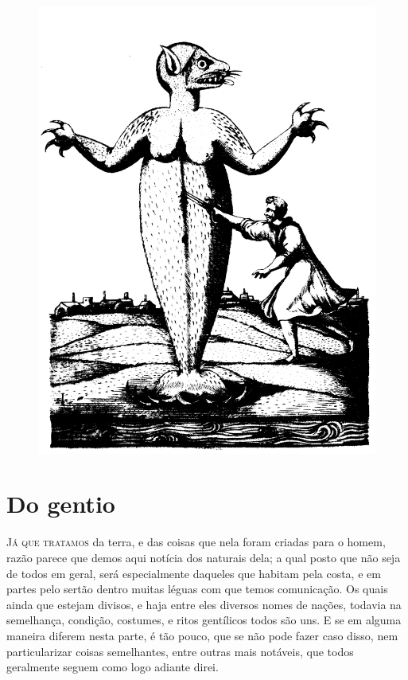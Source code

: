 \begin{figure}
\centering
\includegraphics[width=\textwidth]{1.png}
\end{figure}


\chapter[Do gentio]{Do gentio} 



\noindent\textsc{Já que tratamos} da terra, e das coisas que nela foram criadas para o
homem, razão parece que demos aqui notícia dos naturais dela; a qual
posto que não seja de todos em geral, será especialmente daqueles que
habitam pela costa, e em partes pelo sertão dentro muitas léguas com
que temos comunicação. Os quais ainda que estejam divisos, e haja entre
eles diversos nomes de nações, todavia na semelhança, condição,
costumes, e ritos gentílicos todos são uns. E se em alguma maneira diferem
nesta parte, é tão pouco, que se não pode fazer caso disso, nem
particularizar coisas semelhantes, entre outras mais notáveis, que
todos geralmente seguem como logo adiante direi.

